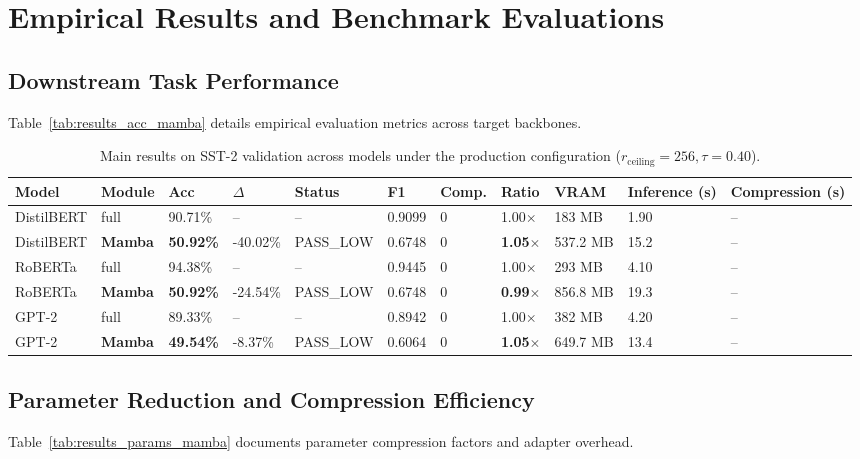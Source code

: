 \section{Empirical Results and Benchmark Evaluations}

\subsection{Downstream Task Performance}
Table~\ref{tab:results_acc_mamba} details empirical evaluation metrics across target backbones.

\begin{table}[t]
\centering
\small
\begin{tabular}{lllllllllll}
\toprule
\textbf{Model} & \textbf{Module} & \textbf{Acc} & \textbf{$\Delta$} & \textbf{Status} & \textbf{F1} & \textbf{Comp.} & \textbf{Ratio} & \textbf{VRAM} & \textbf{Inference (s)} & \textbf{Compression (s)} \\
\midrule
DistilBERT & full & 90.71\% & -- & -- & 0.9099 & 0 & 1.00$\times$ & 183 MB & 1.90 & -- \\
DistilBERT & \textbf{Mamba} & \textbf{50.92\%} & -40.02\% & PASS\_LOW & 0.6748 & 0 & \textbf{1.05$\times$} & 537.2 MB & 15.2 & -- \\
RoBERTa & full & 94.38\% & -- & -- & 0.9445 & 0 & 1.00$\times$ & 293 MB & 4.10 & -- \\
RoBERTa & \textbf{Mamba} & \textbf{50.92\%} & -24.54\% & PASS\_LOW & 0.6748 & 0 & \textbf{0.99$\times$} & 856.8 MB & 19.3 & -- \\
GPT-2 & full & 89.33\% & -- & -- & 0.8942 & 0 & 1.00$\times$ & 382 MB & 4.20 & -- \\
GPT-2 & \textbf{Mamba} & \textbf{49.54\%} & -8.37\% & PASS\_LOW & 0.6064 & 0 & \textbf{1.05$\times$} & 649.7 MB & 13.4 & -- \\
\bottomrule
\end{tabular}
\caption{Main results on SST-2 validation across models under the production configuration ($r_{\mathrm{ceiling}}=256, \tau=0.40$).}
\label{tab:main_sst2}
\end{table}

\subsection{Parameter Reduction and Compression Efficiency}
Table~\ref{tab:results_params_mamba} documents parameter compression factors and adapter overhead.

